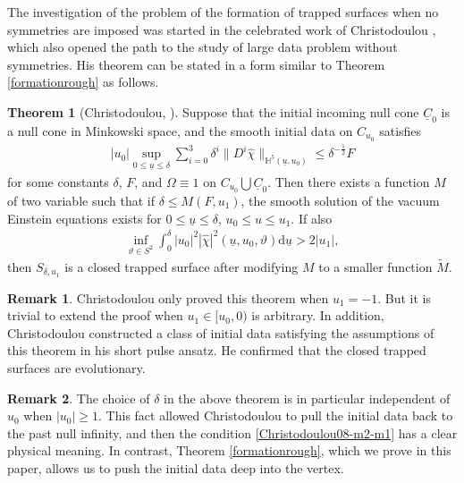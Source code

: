 \documentclass[11pt,reqno]{amsart}
\theoremstyle{definition}
\newtheorem{theorem}{Theorem}[section]
\newtheorem{remark}{Remark}[section]
\numberwithin{equation}{section}
\newcommand{\D}{\mathrm{d}}
\renewcommand{\H}{\mathbb{H}}
\def\chih{\widehat{\chi}}
\def\ub{\underline{u}}
\def\Cb{\underline{C}}
\begin{document}
The investigation of the problem of the formation of trapped surfaces when no symmetries are imposed was started in the celebrated work of Christodoulou \cite{Chr}, which also opened the path to the study of large data problem without symmetries. His theorem can be stated in a form similar to Theorem \ref{formationrough} as follows.
\begin{theorem}[Christodoulou, \cite{Chr}]\label{Chr08}
Suppose that the initial incoming null cone $\Cb_0$ is a null cone in Minkowski space, and the smooth initial data on $C_{u_0}$ satisfies
\begin{align*}
|u_0|\sup_{0\le\ub\le\delta}\sum_{i=0}^3\delta^i\|D^i\chih\|_{\H^5(\ub,u_0)}\le \delta^{-\frac{1}{2}}F
\end{align*}
for some constants $\delta$, $F$, and $\Omega\equiv1$ on $C_{u_0}\bigcup\Cb_0$. Then there exists a function $M$ of two variable such that if $\delta\le M(F,u_1)$, the smooth solution of the vacuum Einstein equations exists for $0\le\ub\le\delta$, $u_0\le u\le u_1$. If also
\begin{align}\label{Christodoulou08-m2-m1}
\inf_{\vartheta\in S^2}\int_0^{\delta}|u_0|^2|\chih|^2(\ub,u_0,\vartheta)\D\ub> 2|u_1|,
\end{align}
then $S_{\delta,u_1}$ is a closed trapped surface after modifying $M$ to a smaller function $\widetilde{M}$.
\end{theorem}
\begin{remark}
Christodoulou only proved this theorem when $u_1=-1$. But it is trivial to extend the proof when $u_1\in[u_0,0)$ is arbitrary. In addition, Christodoulou constructed a class of initial data satisfying the assumptions of this theorem in his short pulse ansatz. He confirmed that the closed trapped surfaces are evolutionary.
\end{remark}
\begin{remark}
The choice of $\delta$ in the above theorem is in particular independent of $u_0$ when $|u_0|\ge1$. This fact allowed Christodoulou to pull the initial data back to the past null infinity, and then the condition \eqref{Christodoulou08-m2-m1} has a clear physical meaning. In contrast, Theorem \ref{formationrough}, which we prove in this paper, allows us to push the initial data deep into the vertex.
\end{remark}
\end{document}
